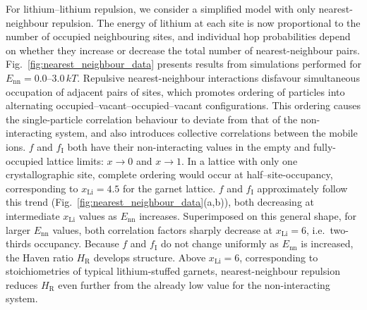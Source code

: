 \documentclass[aps,prb,twocolumn,superscriptaddress,reprint]{revtex4-1}
\newcommand{\xLi}{x_\m{Li}}
\newcommand{\m}[1]{\mathrm{#1}}
\begin{document}
For lithium--lithium repulsion, we consider a simplified model with only nearest-neighbour repulsion. 
The energy of lithium at each site is now proportional to the number of occupied neighbouring sites, and individual hop probabilities depend on whether they increase or decrease the total number of nearest-neighbour pairs. 
Fig.~\ref{fig:nearest_neighbour_data} presents results from simulations performed for $E_\m{nn}=0.0$--$3.0\,kT$. 
Repulsive nearest-neighbour interactions disfavour simultaneous occupation of adjacent pairs of sites, which promotes ordering of particles into alternating  occupied--vacant--occupied--vacant configurations.
This ordering causes the single-particle correlation behaviour to deviate from that of the non-interacting system, and also introduces collective correlations between the mobile ions.\cite{Murch_SolStatIonics1982} $f$ and $f_\m{I}$ both have their non-interacting values in the empty and fully-occupied lattice limits: $x\to0$ and $x\to1$. In a lattice with only one crystallographic site, complete ordering would occur at half--site-occupancy, corresponding to $\xLi=4.5$ for the garnet lattice. $f$ and $f_\m{I}$ approximately follow this trend (Fig.~\ref{fig:nearest_neighbour_data}(a,b)), both decreasing at intermediate $\xLi$ values as $E_\m{nn}$ increases. Superimposed on this general shape, for larger $E_\m{nn}$ values, both correlation factors sharply decrease at $\xLi=6$, i.e.\ two-thirds occupancy. Because $f$ and $f_\m{I}$ do not change uniformly as $E_\m{nn}$ is increased, the Haven ratio $H_\m{R}$ develops structure. Above $\xLi=6$, corresponding to stoichiometries of typical lithium-stuffed garnets, nearest-neighbour repulsion reduces $H_\m{R}$ even further from the already low value for the non-interacting system.
\end{document}
